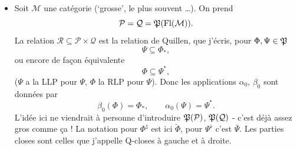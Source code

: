 \begin{itemize}[leftmargin=2.5em]
\item[6)] Soit $\mathcal{M}$ une catégorie (‘grosse’, le plus souvent \dots). On prend
\[
\mathcal{P}=\mathcal{Q}=\mathfrak{P}(\mathrm{Fl}(\mathcal{M})).
\]
La relation $\mathcal{R}\subseteq\mathcal{P}\times\mathcal{Q}$ est la relation de Quillen, que j'écris, pour $\Phi,\Psi\in\mathfrak{P}$
\[
\Psi\subseteq\Phi_{*},
\]
ou encore de façon équivalente
\[
\Phi\subseteq\Psi^{*},
\]
($\Psi$ a la LLP pour $\Psi$, $\Phi$ la RLP pour $\Psi$). Donc les applications $\alpha_0$, $\beta_0$ sont données par %
\[
\beta_0(\Phi)=\Phi_{*},\qquad \alpha_0(\Psi)=\Psi^{*}.
\]
L'idée ici ne viendrait à personne d'introduire $\mathfrak{P}(\mathcal{P})$, $\mathfrak{P}(\mathcal{Q})$ - c'est déjà assez gros comme ça ! La notation pour $\Phi^{\natural}$ est ici $\tilde{\Phi}$, pour $\Psi^{\flat}$ c'est $\bar{\Psi}$. Les parties closes sont celles que j'appelle Q-closes à gauche et à droite.


\end{itemize}
